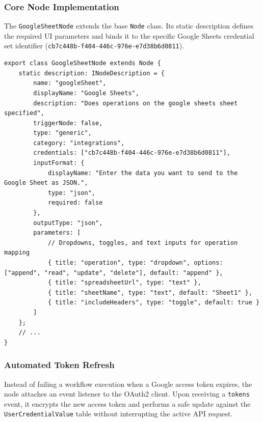 \subsubsection{Core Node Implementation}

The \texttt{GoogleSheetNode} extends the base \texttt{Node} class. Its static description defines the required UI parameters and binds it to the specific Google Sheets credential set identifier (\texttt{cb7c448b-f404-446c-976e-e7d38b6d0811}).

\begin{lstlisting}[caption={Google Sheets Node Description and Configuration}]
export class GoogleSheetNode extends Node {
    static description: INodeDescription = {
        name: "googleSheet",
        displayName: "Google Sheets",
        description: "Does operations on the google sheets sheet specified",
        triggerNode: false,
        type: "generic",
        category: "integrations",
        credentials: ["cb7c448b-f404-446c-976e-e7d38b6d0811"],
        inputFormat: {
            displayName: "Enter the data you want to send to the Google Sheet as JSON.",
            type: "json",
            required: false
        },
        outputType: "json",
        parameters: [
            // Dropdowns, toggles, and text inputs for operation mapping
            { title: "operation", type: "dropdown", options: ["append", "read", "update", "delete"], default: "append" },
            { title: "spreadsheetUrl", type: "text" },
            { title: "sheetName", type: "text", default: "Sheet1" },
            { title: "includeHeaders", type: "toggle", default: true }
        ]
    };
    // ...
}
\end{lstlisting}

\subsubsection{Automated Token Refresh}

Instead of failing a workflow execution when a Google access token expires, the node attaches an event listener to the OAuth2 client. Upon receiving a \texttt{tokens} event, it encrypts the new access token and performs a safe update against the \texttt{UserCredentialValue} table without interrupting the active API request.

